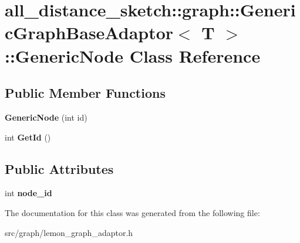 \hypertarget{classall__distance__sketch_1_1graph_1_1GenericGraphBaseAdaptor_1_1GenericNode}{}\section{all\+\_\+distance\+\_\+sketch\+:\+:graph\+:\+:Generic\+Graph\+Base\+Adaptor$<$ T $>$\+:\+:Generic\+Node Class Reference}
\label{classall__distance__sketch_1_1graph_1_1GenericGraphBaseAdaptor_1_1GenericNode}
\subsection*{Public Member Functions}
\begin{DoxyCompactItemize}
\item 
\hypertarget{classall__distance__sketch_1_1graph_1_1GenericGraphBaseAdaptor_1_1GenericNode_a2302007ceeaca71b97d1e2dd41b17469}{}{\bfseries Generic\+Node} (int id)\label{classall__distance__sketch_1_1graph_1_1GenericGraphBaseAdaptor_1_1GenericNode_a2302007ceeaca71b97d1e2dd41b17469}

\item 
\hypertarget{classall__distance__sketch_1_1graph_1_1GenericGraphBaseAdaptor_1_1GenericNode_a06a58ffa8958d6aac9d7a6515165ca36}{}int {\bfseries Get\+Id} ()\label{classall__distance__sketch_1_1graph_1_1GenericGraphBaseAdaptor_1_1GenericNode_a06a58ffa8958d6aac9d7a6515165ca36}

\end{DoxyCompactItemize}
\subsection*{Public Attributes}
\begin{DoxyCompactItemize}
\item 
\hypertarget{classall__distance__sketch_1_1graph_1_1GenericGraphBaseAdaptor_1_1GenericNode_acfcf2747348ddfa5731e0964b4230625}{}int {\bfseries node\+\_\+id}\label{classall__distance__sketch_1_1graph_1_1GenericGraphBaseAdaptor_1_1GenericNode_acfcf2747348ddfa5731e0964b4230625}

\end{DoxyCompactItemize}


The documentation for this class was generated from the following file\+:\begin{DoxyCompactItemize}
\item 
src/graph/lemon\+\_\+graph\+\_\+adaptor.\+h\end{DoxyCompactItemize}
